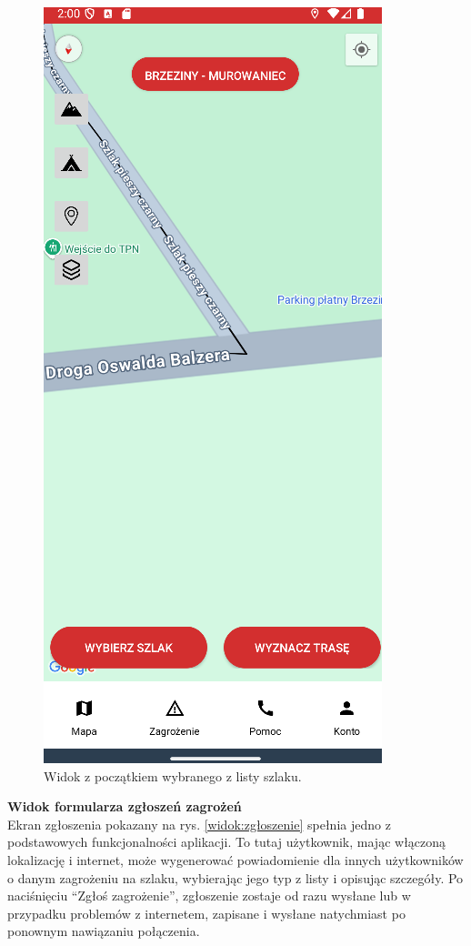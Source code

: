 \begin{figure}[H]
    \centering
    \includegraphics[scale=0.6]{img/imp/po-wyborze-z-listy.png}
    \caption{Widok z początkiem wybranego z listy szlaku.}
    \label{widok:szlak}
\end{figure}
\newpage
\noindent
\textbf{Widok formularza zgłoszeń zagrożeń} \\
\indent Ekran zgłoszenia pokazany na rys. \ref{widok:zgłoszenie} spełnia jedno z podstawowych funkcjonalności aplikacji. To tutaj użytkownik, mając włączoną lokalizację i internet, może wygenerować powiadomienie dla innych użytkowników o danym zagrożeniu na szlaku, wybierając jego typ z listy i opisując szczegóły. Po naciśnięciu “Zgłoś zagrożenie”, zgłoszenie zostaje od razu wysłane lub w przypadku problemów z internetem, zapisane i wysłane natychmiast po ponownym nawiązaniu połączenia.

